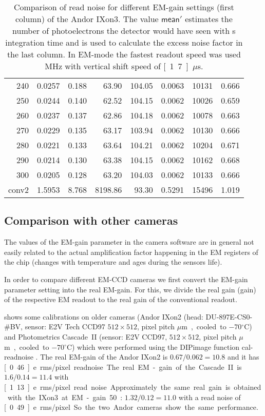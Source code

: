 \begin{table}[!htbp]
\begin{tabular}{r l l r r l r l}
240 & 0.0257 & 0.188 & 63.90 & 104.05 & 0.0063 & 10131 & 0.666 \\
250 & 0.0244 & 0.140 & 62.52 & 104.15 & 0.0062 & 10026 & 0.659 \\
260 & 0.0237 & 0.137 & 62.86 & 104.18 & 0.0062 & 10078 & 0.663 \\
270 & 0.0229 & 0.135 & 63.17 & 103.94 & 0.0062 & 10130 & 0.666 \\
280 & 0.0221 & 0.133 & 63.64 & 104.21 & 0.0062 & 10204 & 0.671 \\
290 & 0.0214 & 0.130 & 63.38 & 104.15 & 0.0062 & 10162 & 0.668 \\
300 & 0.0205 & 0.128 & 63.20 & 104.03 & 0.0062 & 10133 & 0.666 \\
conv2 & 1.5953 & 8.768 & 8198.86 & 93.30 & 0.5291 & 15496 & 1.019 \\
\hline
\end{tabular}
  \caption{Comparison of read noise for different EM-gain settings
    (first column) of the Andor IXon3. The value $\textsf{mean}'$
    estimates the number of photoelectrons the detector would have
    seen with \unit[1]{s} integration time and is used to calculate
    the excess noise factor in the last column. In EM-mode the fastest
    readout speed was used \unit[10]{MHz} with vertical shift speed of
    \unit[1.7]{$\mu$s}.}
  \label{tab:ixon-table}
\end{table}



\subsection{Comparison with other cameras}
The values of the EM-gain parameter in the camera software are in
general not easily related to the actual amplification factor
happening in the EM registers of the chip (changes with temperature
and ages during the sensors life). 

In order to compare different EM-CCD cameras we first convert the
EM-gain parameter setting into the real EM-gain. For this, we divide
the real gain (\textsf{gain}) of the respective EM readout to the real
gain of the conventional readout.

 shows some calibrations on older cameras (Andor
IXon2 (head: DU-897E-CS0-\#BV, sensor: E2V Tech CCD97 $512\times512$,
pixel pitch \unit[16]{$\mu$m}, cooled to $-70{}^\circ\textrm{C}$) and
Photometrics Cascade~II (sensor: E2V CCD97, $512\times512$, pixel
pitch \unit[16]{$\mu$m}, cooled to $-70{}^\circ\textrm{C}$) which were
performed using the DIPimage function \textsf{cal-readnoise}
\citep{Lidke2005a}.  The real EM-gain of the Andor IXon2 is
$0.67/0.062=10.8$ and it has \unit[0.46]{e\ rms/pixel} readnoise. The
real EM-gain of the Cascade~II is $1.6/0.14=11.4$ with \unit[1.13]{e\
  rms/pixel} read noise. Approximately the same real gain is obtained
with the IXon3 at EM-gain 50: $1.32/0.12=11.0$ with a read noise of
\unit[0.49]{e\ rms/pixel}. So the two Andor cameras show the same
performance.

